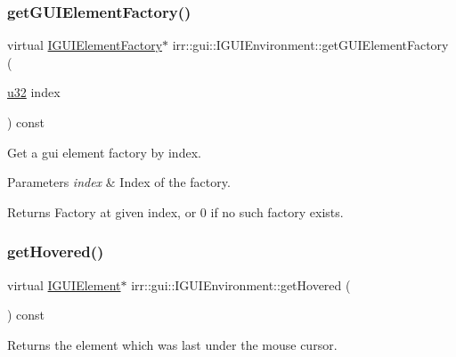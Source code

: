 \subsubsection{\texorpdfstring{get\+G\+U\+I\+Element\+Factory()}{getGUIElementFactory()}}
{\footnotesize\ttfamily virtual \hyperlink{classirr_1_1gui_1_1IGUIElementFactory}{I\+G\+U\+I\+Element\+Factory}$\ast$ irr\+::gui\+::\+I\+G\+U\+I\+Environment\+::get\+G\+U\+I\+Element\+Factory (\begin{DoxyParamCaption}\item[{\hyperlink{namespaceirr_a0416a53257075833e7002efd0a18e804}{u32}}]{index }\end{DoxyParamCaption}) const\hspace{0.3cm}{\ttfamily [pure virtual]}}



Get a gui element factory by index. 


\begin{DoxyParams}{Parameters}
{\em index} & Index of the factory. \\
\hline
\end{DoxyParams}
\begin{DoxyReturn}{Returns}
Factory at given index, or 0 if no such factory exists. 
\end{DoxyReturn}
\mbox{\label{classirr_1_1gui_1_1IGUIEnvironment_a00fa645d517a276553b78fc1d0e78591}} 
\subsubsection{\texorpdfstring{get\+Hovered()}{getHovered()}}
{\footnotesize\ttfamily virtual \hyperlink{classirr_1_1gui_1_1IGUIElement}{I\+G\+U\+I\+Element}$\ast$ irr\+::gui\+::\+I\+G\+U\+I\+Environment\+::get\+Hovered (\begin{DoxyParamCaption}{ }\end{DoxyParamCaption}) const\hspace{0.3cm}{\ttfamily [pure virtual]}}



Returns the element which was last under the mouse cursor. 

